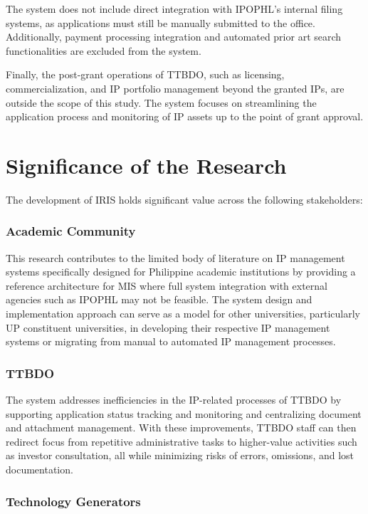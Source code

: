 The system does not include direct integration with IPOPHL's internal filing systems, as applications must still be manually submitted to the office. Additionally, payment processing integration and automated prior art search functionalities are excluded from the system.

Finally, the post-grant operations of TTBDO, such as licensing, commercialization, and IP portfolio management beyond the granted IPs, are outside the scope of this study. The system focuses on streamlining the application process and monitoring of IP assets up to the point of grant approval.
\section{Significance of the Research}

The development of IRIS holds significant value across the following stakeholders:

\subsubsection*{Academic Community}

This research contributes to the limited body of literature on IP management systems specifically designed for Philippine academic institutions by providing a reference architecture for MIS where full system integration with external agencies such as IPOPHL may not be feasible. The system design and implementation approach can serve as a model for other universities, particularly UP constituent universities, in developing their respective IP management systems or migrating from manual to automated IP management processes.

\subsubsection*{TTBDO}

The system addresses inefficiencies in the IP-related processes of TTBDO by supporting application status tracking and monitoring and centralizing document and attachment management. With these improvements, TTBDO staff can then redirect focus from repetitive administrative tasks to higher-value activities such as investor consultation, all while minimizing risks of errors, omissions, and lost documentation.

\subsubsection*{Technology Generators}

